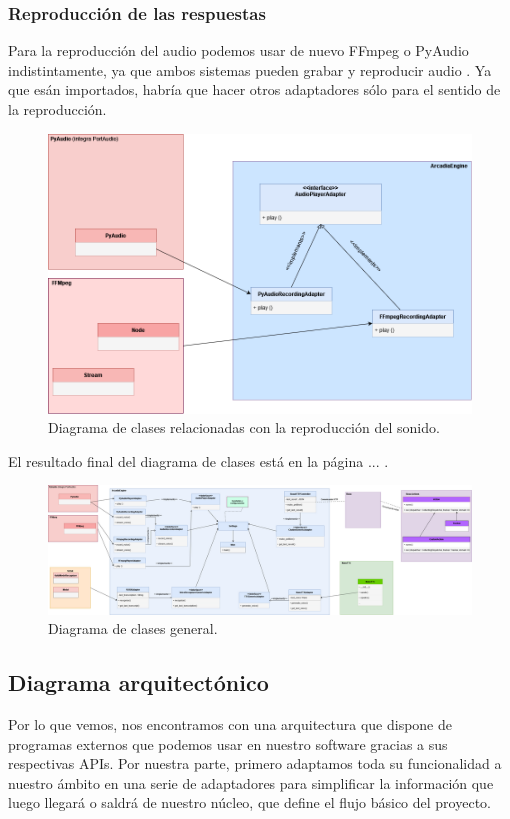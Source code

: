 \subsubsection{Reproducción de las respuestas}
Para la reproducción del audio podemos usar de nuevo FFmpeg o PyAudio indistintamente, ya que ambos sistemas pueden grabar y reproducir audio . Ya que esán importados, habría que hacer otros adaptadores sólo para el sentido de la reproducción.

\begin{figure}[H]
	\includegraphics[width=\textwidth]{imagenes/DiagramaClases_Reproduccion.png}
	\caption{Diagrama de clases relacionadas con la reproducción del sonido.}
\end{figure}

El resultado final del diagrama de clases está en la página ... .
\begin{landscape}
	\begin{figure}
		\includegraphics[width=1.5\textwidth]{imagenes/DiagramaClases_General.png}
		\caption{Diagrama de clases general.}
	\end{figure}
\end{landscape}
\subsection{Diagrama arquitectónico}
Por lo que vemos, nos encontramos con una arquitectura que dispone de programas externos que podemos usar en nuestro software gracias a sus respectivas APIs. Por nuestra parte, primero adaptamos toda su funcionalidad a nuestro ámbito en una serie de adaptadores para simplificar la información que luego llegará o saldrá de nuestro núcleo, que define el flujo básico del proyecto.

